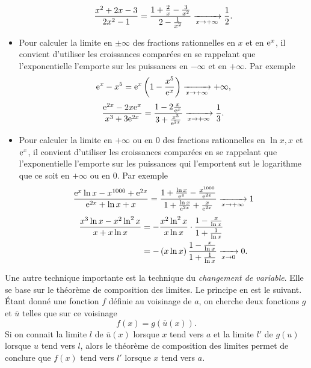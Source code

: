 \documentclass{magnolia}
\begin{document}
\begin{remarques}
\begin{itemize}
 $$\frac{x^2+2x-3}{2x^2-1}=\frac{1+\frac{2}{x}-\frac{3}{x^2}}
                           {2-\frac{1}{x^2}}\xrightarrow[x\rightarrow +\infty]{}\frac{1}{2}.$$
\item Pour calculer la limite en $\pm\infty$ des fractions rationnelles en $x$
  et en ${\rm e}^x$, il convient d'utiliser les croissances comparées en se
  rappelant que l'exponentielle l'emporte sur les puissances
  en $-\infty$ et en $+\infty$. Par exemple
  $${\rm e}^x-x^5={\rm e}^x\left(1-\frac{x^5}{{\rm e}^x}\right)\xrightarrow[x\rightarrow +\infty]{} +\infty,$$
  $$\frac{{\rm e}^{2x}-2x{\rm e}^x}{x^3+3{\rm e}^{2x}}=\frac{1-2\frac{x}{{\rm e}^x}}
    {3+\frac{x^3}{{\rm e}^{2x}}}\xrightarrow[x\rightarrow +\infty]{}\frac{1}{3}.$$
\item Pour calculer la limite en $+\infty$ ou en $0$ des fractions rationnelles
  en $\ln x,x$ et ${\rm e}^x$, il convient d'utiliser les croissances comparées en se
  rappelant que l'exponentielle l'emporte sur les puissances
  qui l'emportent sut le logarithme que ce soit en $+\infty$ ou en $0$.
  Par exemple
  $$\frac{{\rm e}^x\ln x-x^{1000}+{\rm e}^{2x}}{{\rm e}^{2x}+\ln x+x}=
    \frac{1+\frac{\ln x}{{\rm e}^x}-\frac{x^{1000}}{{\rm e}^{2x}}}
         {1+\frac{\ln x}{{\rm e}^{2x}}+\frac{x}{{\rm e}^{2x}}}\xrightarrow[x\rightarrow +\infty]{} 1$$
  \begin{equation*}
  \begin{split}
  \frac{x^3\ln x-x^2\ln^2 x}{x+x\ln x}&=-\frac{x^2\ln^2 x}{x\ln x}\cdot
                                 \frac{1-\frac{x}{\ln x}}{1+\frac{1}{\ln x}}\\
                  &=-\left(x\ln x\right)\frac{1-\frac{x}{\ln x}}{1+\frac{1}{\ln x}}
                    \xrightarrow[x\rightarrow 0]{} 0.
  \end{split}
  \end{equation*}
\end{itemize}
\remarque Une autre technique importante est la technique du \emph{changement de variable}. Elle
se base sur le théorème de composition des limites. Le principe en est le suivant.
Étant donné une fonction $f$ définie
au voisinage de $a$, on cherche deux fonctions $g$ et $\bar{u}$ telles que sur
ce voisinage
$$f(x)=g(\bar{u}(x)).$$
Si on connait la limite $l$ de $\bar{u}(x)$ lorsque $x$ tend vers $a$ et la
limite $l'$ de $g(u)$ lorsque $u$ tend vers $l$, alors le théorème de
composition des limites permet de conclure que $f(x)$ tend vers $l'$ lorsque $x$ tend vers $a$.
\end{remarques}








\end{document}
